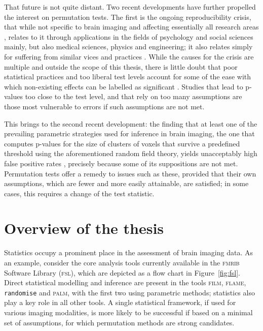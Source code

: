That future is not quite distant. Two recent developments have further propelled the interest on permutation tests. The first is the ongoing reproducibility crisis, that while not specific to brain imaging and affecting essentially all research areas \citep{Baker2016}, relates to it through applications in the fields of psychology and social sciences mainly, but also medical sciences, physics and engineering; it also relates simply for suffering from similar vices and practices \citep{Carp2012, Gorgolewski2016}. While the causes for the crisis are multiple \citep{Eicken2013, Begley2015} and outside the scope of this thesis, there is little doubt that poor statistical practices and too liberal test levels account for some of the ease with which non-existing effects can be labelled as significant \citep{Ioannidis2011}. Studies that lead to p-values too close to the test level, and that rely on too many assumptions are those most vulnerable to errors if such assumptions are not met.

This brings to the second recent development: the finding that at least one of the prevailing parametric strategies used for inference in brain imaging, the one that computes p-values for the size of clusters of voxels that survive a predefined threshold using the aforementioned random field theory, yields unacceptably high false positive rates \citep{Eklund2016}, precisely because some of its suppositions are not met. Permutation tests offer a remedy to issues such as these, provided that their own assumptions, which are fewer and more easily attainable, are satisfied; in some cases, this requires a change of the test statistic.

\section{Overview of the thesis}

Statistics occupy a prominent place in the assessment of brain imaging data. As an example, consider the core analysis tools currently available in the \textsc{fmrib} Software Library (\textsc{fsl}), which are depicted as a flow chart in Figure~\ref{fig:fsl}. Direct statistical modelling and inference are present in the tools \textsc{film}, \textsc{flame}, \texttt{randomise} and \textsc{palm}, with the first two using parametric methods; statistics also play a key role in all other tools. A single statistical framework, if used for various imaging modalities, is more likely to be successful if based on a minimal set of assumptions, for which permutation methods are strong candidates.

